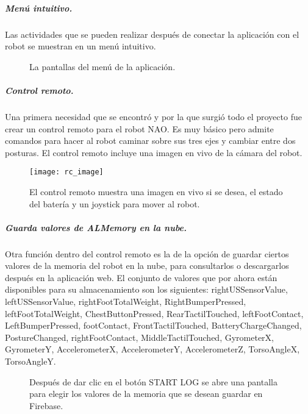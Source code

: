 \subparagraph{Menú intuitivo.}
Las actividades que se pueden realizar después de conectar
la aplicación con el robot se muestran en un menú intuitivo.

\begin{figure}[!h]
    \centering
    \caption{La pantallas del menú de la aplicación.}
    \qquad
    \qquad
    \qquad
\end{figure}



\subparagraph{Control remoto.}
\label{\detokenize{users_docs:control-remoto-para-el-robot}}
Una primera necesidad que se encontró y por la que surgió todo el proyecto
fue crear un control remoto para el robot NAO. Es muy básico pero admite
comandos para hacer al robot caminar sobre sus tres ejes y cambiar entre dos
posturas. El control remoto incluye una imagen en vivo de la
cámara del robot.

\begin{figure}[!h]
    \centering
    \caption{El control remoto muestra una imagen en vivo si se desea, el estado del batería y un joystick para mover al robot.}
\texttt{[image: rc\_image]}

\end{figure}


\subparagraph{Guarda valores de ALMemory en la nube.}
\label{\detokenize{users_docs:guarda-valores-de-almemory-en-la-nube}}
Otra función dentro del control remoto es la de la opción de guardar ciertos
valores de la memoria del robot en la nube, para consultarlos o descargarlos
después en la aplicación web. El conjunto de valores que por ahora
están disponibles para su almacenamiento son los siguientes:
rightUSSensorValue, leftUSSensorValue, rightFootTotalWeight, RightBumperPressed, leftFootTotalWeight, ChestButtonPressed, RearTactilTouched, leftFootContact, LeftBumperPressed, footContact, FrontTactilTouched, BatteryChargeChanged, PostureChanged, rightFootContact, MiddleTactilTouched, GyrometerX, GyrometerY, AccelerometerX, AccelerometerY, AccelerometerZ, TorsoAngleX, TorsoAngleY.

\begin{figure}[!h]
    \centering
    \caption{Después de dar clic en el botón START LOG se abre una pantalla para elegir los valores de la memoria que se desean guardar
    en Firebase.}
    \qquad
\end{figure}


